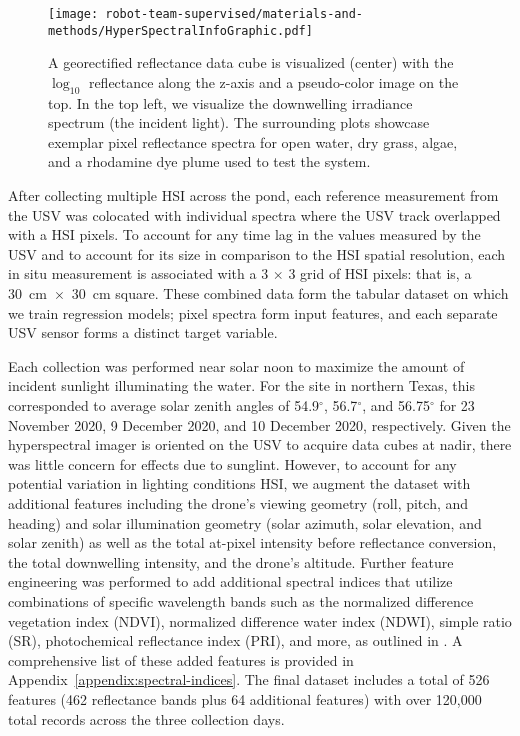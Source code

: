\begin{figure}[H]
  \centering
  \texttt{[image: robot-team-supervised/materials-and-methods/HyperSpectralInfoGraphic.pdf]}
  \caption{A georectified reflectance data cube is visualized (center) with the
    $\log_{10}$ reflectance along the z-axis and a pseudo-color image on the
    top. In the top left, we visualize the downwelling irradiance spectrum (the
    incident light). The surrounding plots showcase exemplar pixel reflectance
    spectra for open water, dry grass, algae, and a rhodamine dye plume used to
    test the system.\label{fig:hsi-infographic}}
\end{figure}


After collecting multiple HSI across the pond, each reference measurement from
the USV was colocated with individual spectra where the USV track overlapped
with a HSI pixels. To account for any time lag in the values measured by the USV
and to account for its size in comparison to the HSI spatial resolution, each in
situ measurement is associated with a 3 $\times$ 3 grid of HSI pixels: that is, a
\mbox{30 cm $\times$ 30 cm} square. These combined data form the tabular dataset on which
we train regression models; pixel spectra form input features, and each separate
USV sensor forms a distinct target variable.


Each collection was performed near solar noon to maximize the amount of incident
sunlight illuminating the water. For the site in northern Texas, this
corresponded to average solar zenith angles of 54.9$^{\circ}$, 56.7$^{\circ}$,
and 56.75$^{\circ}$ for 23 November 2020, 9 December 2020, and 10 December 2020,
respectively. Given the hyperspectral imager is oriented on the USV to acquire
data cubes at nadir, there was little concern for effects due to sunglint.
However, to account for any potential variation in lighting conditions 
HSI, we augment the dataset with additional features including the
drone's viewing geometry (roll, pitch, and heading) and solar illumination
geometry (solar azimuth, solar
elevation, and solar zenith) as well as the total at-pixel intensity before
reflectance conversion, the total downwelling intensity, and the drone's
altitude. Further feature engineering was performed to add additional spectral
indices that utilize combinations of specific wavelength bands such as the
normalized difference vegetation index (NDVI), normalized difference water index
(NDWI), simple ratio (SR), photochemical reflectance index (PRI), and more, as
outlined in \cite{envi_vegetation_indices,
  thenkabail2018hyperspectral,kaufman1992atmospherically, SpectralIndexWheat}. A
comprehensive list of these added features is provided in
Appendix~\ref{appendix:spectral-indices}. The final dataset includes a total of
526 features (462 reflectance bands plus 64 additional features) with over
120,000 total records across the three collection days.


